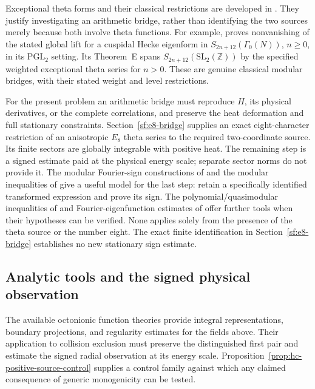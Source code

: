\documentclass[11pt]{article}
\numberwithin{equation}{section}
\theoremstyle{definition}
\theoremstyle{remark}
\begin{document}
Exceptional theta forms and their classical restrictions are
developed in \cite{kim93,pollackg2,pollackspin8,shan26}.
They justify investigating an arithmetic bridge, rather than
identifying the two sources merely because both involve theta
functions.  For example, \cite[Theorem~B]{shan26} proves nonvanishing
of the stated global lift for a cuspidal Hecke eigenform in
\(S_{2n+12}(\Gamma_0(N))\), \(n\ge0\), in its
\(\mathrm{PGL}_2\) setting.  Its Theorem~E spans
\(S_{2n+12}(\mathrm{SL}_2(\mathbb Z))\) by the specified weighted
exceptional theta series for \(n>0\).
These are genuine classical modular bridges, with their stated
weight and level restrictions.

For the present problem an arithmetic bridge must reproduce $H$, its
physical derivatives, or the complete correlations, and preserve the heat
deformation and full stationary constraints. Section~\ref{sf:e8-bridge}
supplies an exact eight-character restriction of an anisotropic $E_8$
theta series to the required two-coordinate source. Its finite sectors
are globally integrable with positive heat. The remaining step is a
signed estimate paid at the physical energy scale; separate sector norms
do not provide it.
The modular Fourier-sign constructions of \cite{viazovska} and the
modular inequalities of \cite{romik,lee24} give a useful model for
the last step: retain a specifically identified transformed expression
and prove its sign.  The polynomial/quasimodular inequalities of
\cite{lee26polynomial} and Fourier-eigenfunction estimates of
\cite{lee26positive} offer further tools when their hypotheses can
be verified.  None applies solely from the presence of the theta
source or the number eight.  The exact finite identification in Section~\ref{sf:e8-bridge} establishes no new
stationary sign estimate.

\subsection{Analytic tools and the signed physical observation}
\label{subsec:octonionic-analysis-literature}

The available octonionic function theories provide integral representations,
boundary projections, and regularity estimates for the fields above.
Their application to collision exclusion must preserve the distinguished
first pair and estimate the signed radial observation at its energy scale.
Proposition~\ref{prop:hc-positive-source-control} supplies a control family
against which any claimed consequence of generic monogenicity can be tested.
\end{document}
